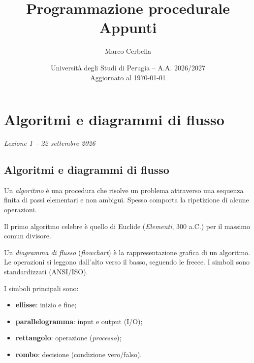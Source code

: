 \documentclass[11pt,a4paper]{article}
\title{Programmazione procedurale\\[0.4em]\large Appunti}
\author{Marco Cerbella}
\date{Università degli Studi di Perugia -- A.A. 2026/2027\\ Aggiornato al \today}
\begin{document}
\maketitle
\setcounter{tocdepth}{1}
\tableofcontents
\clearpage

\section[Algoritmi e diagrammi di flusso (Lezione 1 -- 22 settembre 2026)]{Algoritmi e diagrammi di flusso}
\noindent\emph{Lezione 1 -- 22 settembre 2026}
\subsection{Algoritmi e diagrammi di flusso}

\begin{definizione}
Un \emph{algoritmo} è una procedura che risolve un problema attraverso una
sequenza finita di passi elementari e non ambigui. Spesso comporta la
ripetizione di alcune operazioni.
\end{definizione}

\begin{esempio}
Il primo algoritmo celebre è quello di Euclide (\emph{Elementi}, 300 a.C.) per
il massimo comun divisore.
\end{esempio}

\begin{definizione}
Un \emph{diagramma di flusso} (\emph{flowchart}) è la rappresentazione grafica
di un algoritmo. Le operazioni si leggono dall'alto verso il basso, seguendo le
frecce. I simboli sono standardizzati (ANSI/ISO).
\end{definizione}

I simboli principali sono:
\begin{itemize}
    \item \textbf{ellisse}: inizio e fine;
    \item \textbf{parallelogramma}: input e output (I/O);
    \item \textbf{rettangolo}: operazione (\emph{processo});
    \item \textbf{rombo}: decisione (condizione vero/falso).
\end{itemize}

\begin{center}
\end{center}
\end{document}
